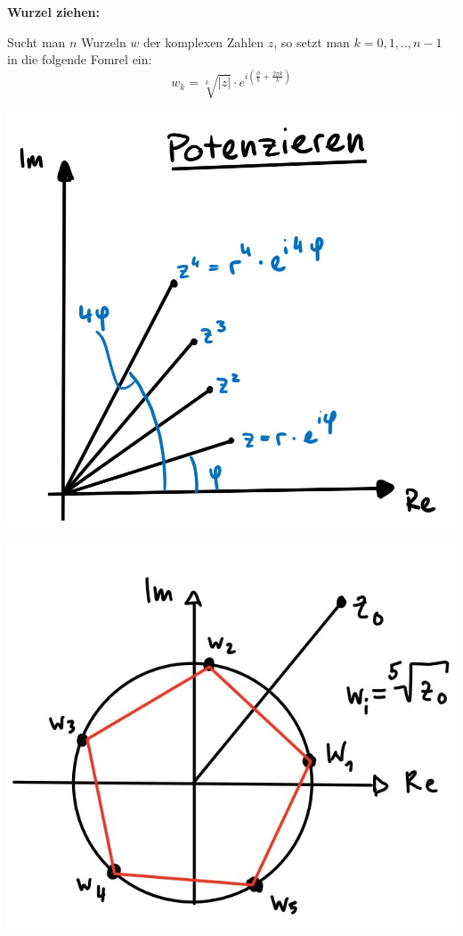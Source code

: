        \textbf{Wurzel ziehen:}
       
       Sucht man $n$ Wurzeln $w$ der komplexen Zahlen $z$, so setzt man $k = 0, 1,..,n-1$ in die folgende Fomrel ein: 
       $$ w_k = \sqrt[k]{|z|} \cdot e^{i(\frac{\phi}{k} + \frac{2\pi k}{k})} $$

       \begin{minipage}{0.49\linewidth}
           \includegraphics[width=\linewidth]{src/Appendix/1_komplexe_Zahlen_potenzieren.jpg}
       \end{minipage}
       \begin{minipage}{0.5\linewidth}
        \includegraphics[width= \linewidth]{src/Appendix/kompl_Zahlen_wurzeln.jpg}
       \end{minipage}